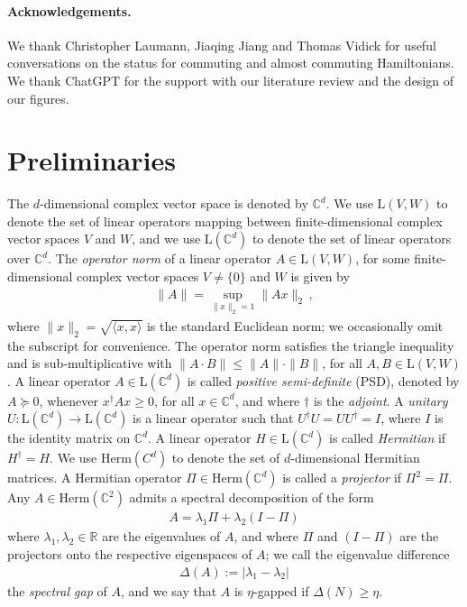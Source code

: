 \documentclass[11pt]{article}
\theoremstyle{plain}
\newif\ifanon
\begin{document}

\ifanon
\else
\paragraph{Acknowledgements.}
We thank Christopher Laumann, Jiaqing Jiang and Thomas Vidick for useful conversations on the status for commuting and almost commuting Hamiltonians. We thank
ChatGPT for the support with our literature review and the design of our figures.
\fi

\section{Preliminaries}
\label{sec:background}

The $d$-dimensional complex vector space is denoted by $\mathbb{C}^d$. We use $\mathrm{L}(V,W)$ to denote the set of linear operators mapping between finite-dimensional complex vector spaces $V$ and $W$, and we use
$\mathrm{L}(\mathbb{C}^d)$ to denote the set of linear operators over $\mathbb{C}^d$. The \emph{operator norm} of a linear operator $A \in \mathrm{L}(V,W)$, for some finite-dimensional complex vector spaces $V \neq \{0\}$ and $W$ is given by
\begin{align}
\|A \| = \sup_{\|x\|_2 =1} \|A x\|_2 \, ,    
\end{align}
where $\|x \|_2 = \sqrt{\langle x,x \rangle}$ is the standard Euclidean norm; we occasionally omit the subscript for convenience. The operator norm satisfies the triangle inequality and is sub-multiplicative with $\|A \cdot B\| \leq \|A\| \cdot \|B\|$, for all $A,B \in \mathrm{L}(V,W)$.
A linear operator $A \in \mathrm{L}(\mathbb{C}^d)$ is called \emph{positive semi-definite} (PSD), denoted by $A \succeq 0$, whenever $x^\dag A x \geq 0$, for all $x \in \mathbb{C}^d$, and where $\dag$ is the \emph{adjoint}.
A \emph{unitary} $U: \mathrm{L} (\mathbb{C}^d) \to \mathrm{L}(\mathbb{C}^d)$ is a linear operator such that $U^\dagger U = U U^\dagger = I$, where $I$ is the identity matrix on $\mathbb{C}^d$. 
A linear operator $H \in \mathrm{L}(\mathbb{C}^d)$ is called \emph{Hermitian} if $H^\dag = H$. We use $\mathrm{Herm}(C^{d})$ to denote the set of $d$-dimensional Hermitian matrices. 
A Hermitian operator $\Pi \in \mathrm{Herm}(\mathbb{C}^{d})$ is called a \emph{projector} if $\Pi^2=\Pi$. Any $A \in \mathrm{Herm}(\mathbb{C}^{2})$ admits a spectral decomposition of the form 
\begin{align}
 A = \lambda_1 \Pi + \lambda_2 (I -\Pi)   
\end{align}
where $\lambda_1,\lambda_2 \in \mathbb{R}$ are the eigenvalues of $A$, and where $\Pi$ and $(I-\Pi)$ are the projectors onto the respective eigenspaces of $A$; we call the eigenvalue difference
\begin{align}
\Delta(A) := |\lambda_1 - \lambda_2|   
\end{align}
the \emph{spectral gap} of $A$, and we say that $A$ is
$\eta$-gapped if $\Delta(N) \geq \eta$.
\end{document}
